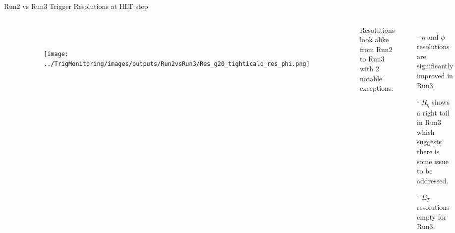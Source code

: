 \documentclass[aspectratio=1610,8pt]{beamer}					%
\begin{document}
\begin{frame}{Run2 vs Run3 Trigger Resolutions at HLT step}
\begin{columns}
\begin{figure}[h!]
\begin{subfigure}[b]{.3\textwidth}
            \caption{~}
        \end{subfigure}
        \begin{subfigure}[b]{.3\textwidth}
            \centering
            \texttt{[image: ../TrigMonitoring/images/outputs/Run2vsRun3/Res\_g20\_tighticalo\_res\_phi.png]}
            \caption{~}
        \end{subfigure}
    \end{figure}
    Resolutions look alike from Run2 to Run3 with 2 notable exceptions:
    \begin{itemize}
        \item [-]
            $ \eta$ and $ \phi$ resolutions are significantly improved in Run3.
        \item [-]
            $R_{\eta}$ shows a right tail in Run3 which suggests there is some issue to be addressed.
        \item [-]
            $E_T$ resolutions empty for Run3.
    \end{itemize}
    \end{columns}
\end{frame}
\end{document}
